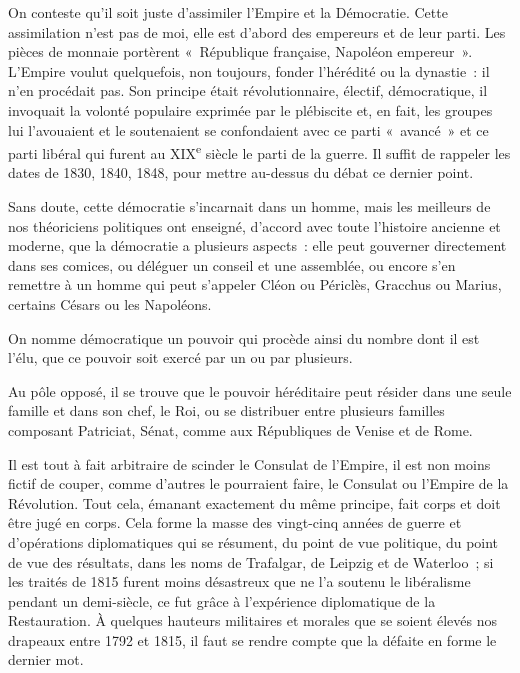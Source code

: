 \documentclass[french,twoside]{book} %
\newcommand{\astermono}{\medskip\centerline{\color{rubric}\large\selectfont{\syms ✻}}\medskip\par}%
\begin{document}
\astermono

\noindent On conteste qu’il soit juste d’assimiler l’Empire et la Démocratie. Cette assimilation n’est pas de moi, elle est d’abord des empereurs et de leur parti. Les pièces de monnaie portèrent « République française, Napoléon empereur ». L’Empire voulut quelquefois, non toujours, fonder l’hérédité ou la dynastie : il n’en procédait pas. Son principe était révolutionnaire, électif, démocratique, il invoquait la volonté populaire exprimée par le plébiscite et, en fait, les groupes lui l’avouaient et le soutenaient se confondaient avec ce parti « avancé » et ce parti libéral qui furent au XIX\textsuperscript{e} siècle le parti de la guerre. Il suffit de rappeler les dates de 1830, 1840, 1848, pour mettre au-dessus du débat ce dernier point.\par
Sans doute, cette démocratie s’incarnait dans un homme, mais les meilleurs de nos théoriciens politiques ont enseigné, d’accord avec toute l’histoire ancienne et moderne, que la démocratie a plusieurs aspects : elle peut gouverner directement dans ses comices, ou déléguer un conseil et une assemblée, ou encore s’en remettre à un homme qui peut s’appeler Cléon ou Périclès, Gracchus ou Marius, certains Césars ou les Napoléons.\par
On nomme démocratique un pouvoir qui procède ainsi du nombre dont il est l’élu, que ce pouvoir soit exercé par un ou par plusieurs.\par
Au pôle opposé, il se trouve que le pouvoir héréditaire peut résider dans une seule famille et dans son chef, le Roi, ou se distribuer entre plusieurs familles composant Patriciat, Sénat, comme aux Républiques de Venise et de Rome.\par

\astermono

\noindent Il est tout à fait arbitraire de scinder le Consulat de l’Empire, il est non moins fictif de couper, comme d’autres le pourraient faire, le Consulat ou l’Empire de la Révolution. Tout cela, émanant exactement du même principe, fait corps et doit être jugé en corps. Cela forme la masse des vingt-cinq années de guerre et d’opérations diplomatiques qui se résument, du point de vue politique, du point de vue des résultats, dans les noms de Trafalgar, de Leipzig et de Waterloo ; si les traités de 1815 furent moins désastreux que ne l’a soutenu le libéralisme pendant un demi-siècle, ce fut grâce à l’expérience diplomatique de la Restauration. À quelques hauteurs militaires et morales que se soient élevés nos drapeaux entre 1792 et 1815, il faut se rendre compte que la défaite en forme le dernier mot.\par
\end{document}
